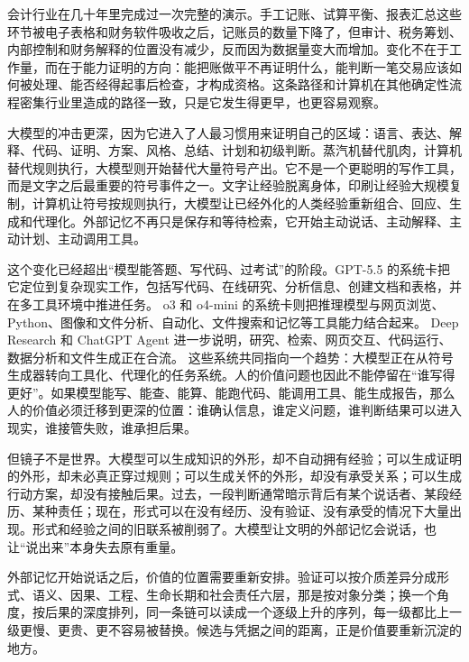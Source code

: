 会计行业在几十年里完成过一次完整的演示。手工记账、试算平衡、报表汇总这些环节被电子表格和财务软件吸收之后，记账员的数量下降了，但审计、税务筹划、内部控制和财务解释的位置没有减少，反而因为数据量变大而增加。变化不在于工作量，而在于能力证明的方向：能把账做平不再证明什么，能判断一笔交易应该如何被处理、能否经得起事后检查，才构成资格。这条路径和计算机在其他确定性流程密集行业里造成的路径一致，只是它发生得更早，也更容易观察。

大模型的冲击更深，因为它进入了人最习惯用来证明自己的区域：语言、表达、解释、代码、证明、方案、风格、总结、计划和初级判断。蒸汽机替代肌肉，计算机替代规则执行，大模型则开始替代大量符号产出。它不是一个更聪明的写作工具，而是文字之后最重要的符号事件之一。文字让经验脱离身体，印刷让经验大规模复制，计算机让符号按规则执行，大模型让已经外化的人类经验重新组合、回应、生成和代理化。外部记忆不再只是保存和等待检索，它开始主动说话、主动解释、主动计划、主动调用工具。

这个变化已经超出“模型能答题、写代码、过考试”的阶段。GPT-5.5 的系统卡把它定位到复杂现实工作，包括写代码、在线研究、分析信息、创建文档和表格，并在多工具环境中推进任务。\cite{openai2026gpt55systemcard} o3 和 o4-mini 的系统卡则把推理模型与网页浏览、Python、图像和文件分析、自动化、文件搜索和记忆等工具能力结合起来。\cite{openai2025o3o4minisystemcard} Deep Research 和 ChatGPT Agent 进一步说明，研究、检索、网页交互、代码运行、数据分析和文件生成正在合流。\cite{openai2025deepresearchsystemcard,openai2025chatgptagentsystemcard} 这些系统共同指向一个趋势：大模型正在从符号生成器转向工具化、代理化的任务系统。人的价值问题也因此不能停留在“谁写得更好”。如果模型能写、能查、能算、能跑代码、能调用工具、能生成报告，那么人的价值必须迁移到更深的位置：谁确认信息，谁定义问题，谁判断结果可以进入现实，谁接管失败，谁承担后果。

但镜子不是世界。大模型可以生成知识的外形，却不自动拥有经验；可以生成证明的外形，却未必真正穿过规则；可以生成关怀的外形，却没有承受关系；可以生成行动方案，却没有接触后果。过去，一段判断通常暗示背后有某个说话者、某段经历、某种责任；现在，形式可以在没有经历、没有验证、没有承受的情况下大量出现。形式和经验之间的旧联系被削弱了。大模型让文明的外部记忆会说话，也让“说出来”本身失去原有重量。


外部记忆开始说话之后，价值的位置需要重新安排。验证可以按介质差异分成形式、语义、因果、工程、生命长期和社会责任六层，那是按对象分类；换一个角度，按后果的深度排列，同一条链可以读成一个逐级上升的序列，每一级都比上一级更慢、更贵、更不容易被替换。候选与凭据之间的距离，正是价值要重新沉淀的地方。

